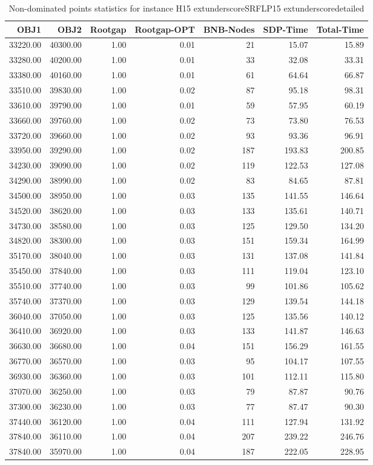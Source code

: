 \begin{table}
\caption{Non-dominated points statistics for instance H15	extunderscoreSRFLP15	extunderscoredetailed}
\label{tab:stats/H15_SRFLP15_detailed}
\begin{tabular}{rrrrrrr}
\toprule
OBJ1 & OBJ2 & Rootgap & Rootgap-OPT & BNB-Nodes & SDP-Time & Total-Time \\
\midrule
33220.00 & 40300.00 & 1.00 & 0.01 & 21 & 15.07 & 15.89 \\
33280.00 & 40200.00 & 1.00 & 0.01 & 33 & 32.08 & 33.31 \\
33380.00 & 40160.00 & 1.00 & 0.01 & 61 & 64.64 & 66.87 \\
33510.00 & 39830.00 & 1.00 & 0.02 & 87 & 95.18 & 98.31 \\
33610.00 & 39790.00 & 1.00 & 0.01 & 59 & 57.95 & 60.19 \\
33660.00 & 39760.00 & 1.00 & 0.02 & 73 & 73.80 & 76.53 \\
33720.00 & 39660.00 & 1.00 & 0.02 & 93 & 93.36 & 96.91 \\
33950.00 & 39290.00 & 1.00 & 0.02 & 187 & 193.83 & 200.85 \\
34230.00 & 39090.00 & 1.00 & 0.02 & 119 & 122.53 & 127.08 \\
34290.00 & 38990.00 & 1.00 & 0.02 & 83 & 84.65 & 87.81 \\
34500.00 & 38950.00 & 1.00 & 0.03 & 135 & 141.55 & 146.64 \\
34520.00 & 38620.00 & 1.00 & 0.03 & 133 & 135.61 & 140.71 \\
34730.00 & 38580.00 & 1.00 & 0.03 & 125 & 129.50 & 134.20 \\
34820.00 & 38300.00 & 1.00 & 0.03 & 151 & 159.34 & 164.99 \\
35170.00 & 38040.00 & 1.00 & 0.03 & 131 & 137.08 & 141.84 \\
35450.00 & 37840.00 & 1.00 & 0.03 & 111 & 119.04 & 123.10 \\
35510.00 & 37740.00 & 1.00 & 0.03 & 99 & 101.86 & 105.62 \\
35740.00 & 37370.00 & 1.00 & 0.03 & 129 & 139.54 & 144.18 \\
36040.00 & 37050.00 & 1.00 & 0.03 & 125 & 135.56 & 140.12 \\
36410.00 & 36920.00 & 1.00 & 0.03 & 133 & 141.87 & 146.63 \\
36630.00 & 36680.00 & 1.00 & 0.04 & 151 & 156.29 & 161.55 \\
36770.00 & 36570.00 & 1.00 & 0.03 & 95 & 104.17 & 107.55 \\
36930.00 & 36360.00 & 1.00 & 0.03 & 101 & 112.11 & 115.80 \\
37070.00 & 36250.00 & 1.00 & 0.03 & 79 & 87.87 & 90.76 \\
37300.00 & 36230.00 & 1.00 & 0.03 & 77 & 87.47 & 90.30 \\
37440.00 & 36120.00 & 1.00 & 0.04 & 111 & 127.94 & 131.92 \\
37840.00 & 36110.00 & 1.00 & 0.04 & 207 & 239.22 & 246.76 \\
37840.00 & 35970.00 & 1.00 & 0.04 & 187 & 222.05 & 228.95 \\
\bottomrule
\end{tabular}
\end{table}
